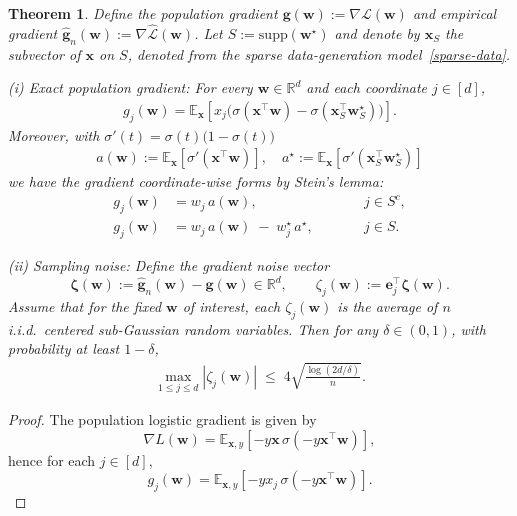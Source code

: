 \documentclass{article}
\theoremstyle{plain}
\newtheorem{theorem}{Theorem}[section]
\theoremstyle{definition}
\theoremstyle{remark}
\begin{document}
{\begin{theorem}
\label{pop-grad-restate}
Define the population gradient $\mathbf g(\mathbf w):=\nabla \mathcal L(\mathbf w)$ and empirical gradient
$\widehat{\mathbf g}_n(\mathbf w):=\nabla \widehat{\mathcal L}(\mathbf w)$.
Let $S:=\mathrm{supp}(\mathbf w^\star)$ and denote by $\mathbf x_S$ the subvector of $\mathbf x$ on $S$, denoted from the sparse data-generation model~\eqref{sparse-data}. 

(i) Exact population gradient:
For every $\mathbf w\in\mathbb R^d$ and each coordinate $j\in[d]$,
\begin{align}
g_j(\mathbf w)
=
\mathbb E_{\mathbf x}\!\left[
x_j\Big(\sigma(\mathbf x^\top \mathbf w)-\sigma(\mathbf x_S^\top \mathbf w_S^\star)\Big)
\right].
\label{eq:pop_grad_exact-restate}
\end{align}
Moreover, with $\sigma'(t)=\sigma(t)\bigl(1-\sigma(t)\bigr)$ 
\begin{align}
    a(\mathbf w):=\mathbb E_{\mathbf x}\!\left[\sigma'(\mathbf x^\top \mathbf w)\right],
\quad
a^\star:=\mathbb E_{\mathbf x}\!\left[\sigma'(\mathbf x_S^\top \mathbf w_S^\star)\right]
\end{align}
 we have the gradient coordinate-wise forms by Stein's lemma:
\begin{align}
g_j(\mathbf w) &= w_j\, a(\mathbf w), \qquad && j\in S^c,
\label{eq:pop_grad_inactive-restate}
\\
g_j(\mathbf w) &= w_j\, a(\mathbf w) \;-\; w_j^\star\, a^\star, \qquad && j\in S.
\label{eq:pop_grad_active-restate}
\end{align}

\medskip
(ii) Sampling noise:
Define the gradient noise vector
\[
\boldsymbol\zeta(\mathbf w):=\widehat{\mathbf g}_n(\mathbf w)-\mathbf g(\mathbf w)\in\mathbb R^d,
\qquad
\zeta_j(\mathbf w):=\mathbf e_j^\top \boldsymbol\zeta(\mathbf w).
\]
Assume that for the fixed $\mathbf w$ of interest, each $\zeta_j(\mathbf w)$ is the average of $n$ i.i.d.\ centered sub-Gaussian random variables. Then for any $\delta\in(0,1)$, with probability at least $1-\delta$,
\begin{align}
\max_{1\le j\le d} |\zeta_j(\mathbf w)|
\;\le\;
4\sqrt{\frac{\log(2d/\delta)}{n}}.
\label{eq:uniform_coord_noise}
\end{align}
\end{theorem}

\begin{proof}
The population logistic gradient is given by
\[
\nabla L(\boldsymbol w)=\mathbb E_{\boldsymbol x,y}\!\left[-y\boldsymbol x\,\sigma(-y\boldsymbol x^\top \boldsymbol w)\right],
\]
hence for each $j\in[d]$,
\begin{equation}
\label{eq:gj_start-restate}
g_j(\boldsymbol w)=\mathbb E_{\boldsymbol x,y}\!\left[-y x_j\,\sigma(-y\boldsymbol x^\top \boldsymbol w)\right].
\end{equation}


\end{proof}}
\end{document}
